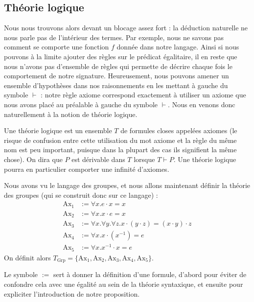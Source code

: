 \subsection{Théorie logique}

Nous nous trouvons alors devant un blocage assez fort : la déduction naturelle ne nous parle pas de l'intérieur des termes. Par exemple, nous ne savons pas comment se comporte une fonction $f$ donnée dans notre langage. Ainsi si nous pouvons à la limite ajouter des règles sur le prédicat égalitaire, il en reste que nous n'avons pas d'ensemble de règles qui permette de décrire chaque fois le comportement de notre signature. Heureusement, nous pouvons amener un ensemble d'hypothèses dans nos raisonnements en les mettant à gauche du symbole $\vdash$ : notre règle axiome correspond exactement à utiliser un axiome que nous avons placé au préalable à gauche du symbole $\vdash$. Nous en venons donc naturellement à la notion de théorie logique.

\begin{defi}
    Une théorie logique est un ensemble $T$ de formules closes appelées axiomes (le risque de confusion entre cette utilisation du mot axiome et la règle du même nom est peu important, puisque dans la plupart des cas ils signifient la même chose). On dira que $P$ est dérivable dans $T$ lorsque $T\vdash P$. Une théorie logique pourra en particulier comporter une infinité d'axiomes.
\end{defi}

\begin{expl}
    Nous avons vu le langage des groupes, et nous allons maintenant définir la théorie des groupes (qui se construit donc sur ce langage) :
    \begin{align*}
            \mathrm{Ax}_1 &:=\forall x.e\cdot x = x\\
            \mathrm{Ax}_2 &:=\forall x.x \cdot e = x\\
            \mathrm{Ax}_3 &:=\forall x.\forall y.\forall z. x\cdot (y\cdot z) = (x\cdot y)\cdot z\\
            \mathrm{Ax}_4 &:=\forall x. x\cdot (x^{-1}) = e\\
            \mathrm{Ax}_5 &:=\forall x. x^{-1}\cdot x = e
    \end{align*}
    On définit alors $T_{\mathrm{Grp}} = \{\mathrm{Ax}_1,\mathrm{Ax}_2,\mathrm{Ax}_3,\mathrm{Ax}_4,\mathrm{Ax}_5\}$.
\end{expl}

\begin{rmk}
    Le symbole $:=$ sert à donner la définition d'une formule, d'abord pour éviter de confondre cela avec une égalité au sein de la théorie syntaxique, et ensuite pour expliciter l'introduction de notre proposition.
\end{rmk}

